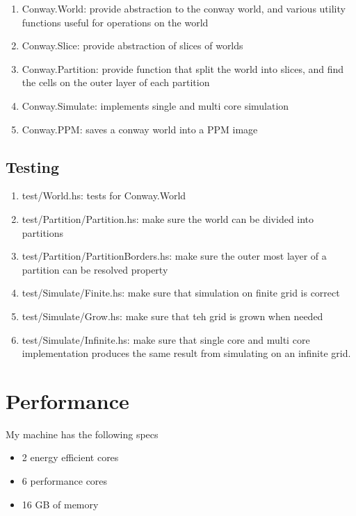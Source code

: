 \documentclass{article}
\newcommand{\code}[1]{{\ttfamily #1}}
\begin{document}
      \begin{enumerate}
        \item \code{Conway.World}: provide abstraction to the conway world,
        and various utility functions useful for operations on the world
        \item \code{Conway.Slice}: provide abstraction of slices of worlds
        \item \code{Conway.Partition}: provide function that split the world
        into slices, and find the cells on the outer layer of each partition
        \item \code{Conway.Simulate}: implements single and multi core
        simulation
        \item \code{Conway.PPM}: saves a conway world into a PPM image
      \end{enumerate}

    \subsection{Testing}

      \begin{enumerate}
        \item \code{test/World.hs}: tests for \code{Conway.World}
        \item \code{test/Partition/Partition.hs}: make sure the world can be
        divided into partitions
        \item \code{test/Partition/PartitionBorders.hs}: make sure the outer
        most layer of a partition can be resolved property
        \item \code{test/Simulate/Finite.hs}: make sure that simulation on
        finite grid is correct
        \item \code{test/Simulate/Grow.hs}: make sure that teh grid is grown
        when needed
        \item \code{test/Simulate/Infinite.hs}: make sure that single core
        and multi core implementation produces the same result from simulating
        on an infinite grid.
      \end{enumerate}

  \section{Performance}

    My machine has the following specs

    \begin{itemize}
      \item 2 energy efficient cores
      \item 6 performance cores
      \item 16 GB of memory
    \end{itemize}
\end{document}
